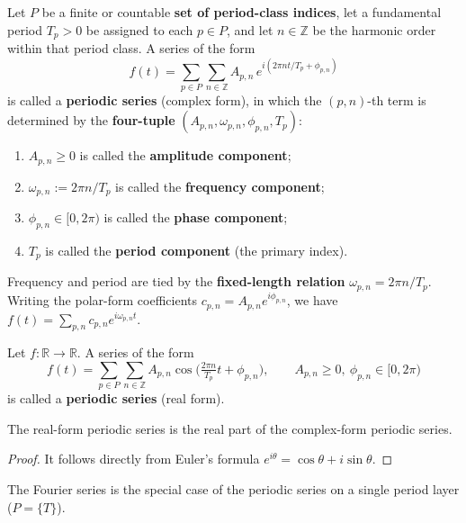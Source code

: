 \begin{definition}\label{def:periodic_series}
Let $P$ be a finite or countable \textbf{set of period-class indices}, let a fundamental period $T_p > 0$ be assigned to each $p \in P$, and let $n \in \mathbb{Z}$ be the harmonic order within that period class. A series of the form
\[
f(t) = \sum_{p \in P} \sum_{n \in \mathbb{Z}} A_{p,n}\, e^{i(2\pi n t / T_p + \phi_{p,n})}
\]
is called a \textbf{periodic series} (complex form), in which the $(p,n)$-th term is determined by the \textbf{four-tuple} $(A_{p,n}, \omega_{p,n}, \phi_{p,n}, T_p)$:
\begin{enumerate}[label=(\roman*)]
    \item $A_{p,n} \ge 0$ is called the \textbf{amplitude component};
    \item $\omega_{p,n} := 2\pi n / T_p$ is called the \textbf{frequency component};
    \item $\phi_{p,n} \in [0, 2\pi)$ is called the \textbf{phase component};
    \item $T_p$ is called the \textbf{period component} (the primary index).
\end{enumerate}
Frequency and period are tied by the \textbf{fixed-length relation} $\omega_{p,n} = 2\pi n / T_p$. Writing the polar-form coefficients $c_{p,n} = A_{p,n} e^{i\phi_{p,n}}$, we have $f(t) = \sum_{p,n} c_{p,n} e^{i\omega_{p,n} t}$.
\end{definition}

\begin{definition}\label{def:periodic_series_real}
Let $f: \mathbb{R} \to \mathbb{R}$. A series of the form
\[
f(t) = \sum_{p \in P} \sum_{n \in \mathbb{Z}} A_{p,n} \cos\!\big( \tfrac{2\pi n}{T_p} t + \phi_{p,n} \big), \qquad A_{p,n} \ge 0,\ \phi_{p,n} \in [0, 2\pi)
\]
is called a \textbf{periodic series} (real form).
\end{definition}

\begin{proposition}\label{prop:periodic_series_real_complex}
The real-form periodic series is the real part of the complex-form periodic series.
\end{proposition}

\begin{proof}
It follows directly from Euler's formula $e^{i\theta} = \cos\theta + i\sin\theta$.
\end{proof}

\begin{proposition}\label{prop:fourier_as_periodic_series}
The Fourier series is the special case of the periodic series on a single period layer ($P = \{T\}$).
\end{proposition}

